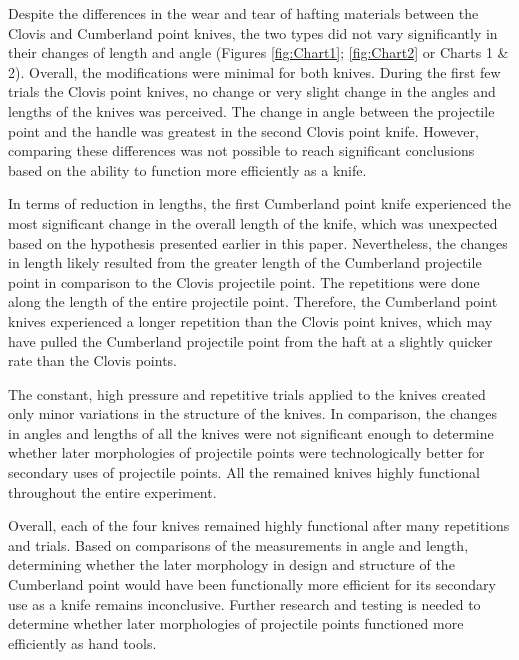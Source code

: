 Despite the differences in the wear and tear of hafting materials between the Clovis and Cumberland point knives, the two types did not vary significantly in their changes of length and angle (Figures \ref{fig:Chart1}; \ref{fig:Chart2} or Charts 1 \& 2). Overall, the modifications were minimal for both knives. During the first few trials the Clovis point knives, no change or very slight change in the angles and lengths of the knives was perceived. The change in angle between the projectile point and the handle was greatest in the second Clovis point knife. However, comparing these differences was not possible to reach significant conclusions based on the ability to function more efficiently as a knife.
	
In terms of reduction in lengths, the first Cumberland point knife experienced the most significant change in the overall length of the knife, which was unexpected based on the hypothesis presented earlier in this paper. Nevertheless, the changes in length likely resulted from the greater length of the Cumberland projectile point in comparison to the Clovis projectile point. The repetitions were done along the length of the entire projectile point. Therefore, the Cumberland point knives experienced a longer repetition than the Clovis point knives, which may have pulled the Cumberland projectile point from the haft at a slightly quicker rate than the Clovis points. 

The constant, high pressure and repetitive trials applied to the knives created only minor variations in the structure of the knives. In comparison, the changes in angles and lengths of all the knives were not significant enough to determine whether later morphologies of projectile points were technologically better for secondary uses of projectile points. All the remained knives highly functional throughout the entire experiment. 

	


Overall, each of the four knives remained highly functional after many repetitions and trials. Based on comparisons of the measurements in angle and length, determining whether the later morphology in design and structure of the Cumberland point would have been functionally more efficient for its secondary use as a knife remains inconclusive. Further research and testing is needed to determine whether later morphologies of projectile points functioned more efficiently as hand tools.

